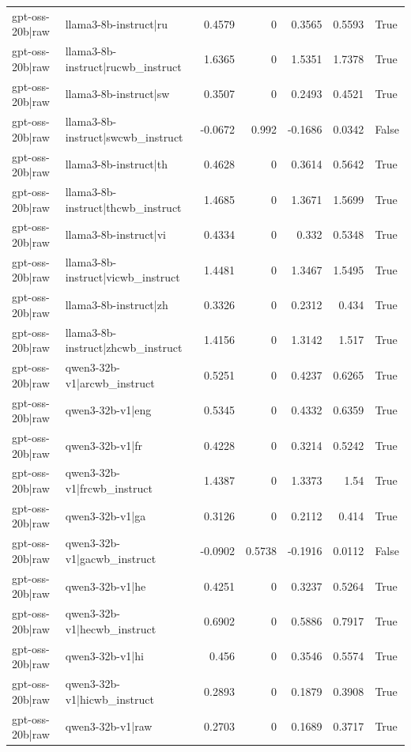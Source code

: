 \begin{table}
\begin{tabular}{l l r r r r l}
gpt-oss-20b|raw & llama3-8b-instruct|ru & 0.4579 & 0 & 0.3565 & 0.5593 & True \\
gpt-oss-20b|raw & llama3-8b-instruct|rucwb_instruct & 1.6365 & 0 & 1.5351 & 1.7378 & True \\
gpt-oss-20b|raw & llama3-8b-instruct|sw & 0.3507 & 0 & 0.2493 & 0.4521 & True \\
gpt-oss-20b|raw & llama3-8b-instruct|swcwb_instruct & -0.0672 & 0.992 & -0.1686 & 0.0342 & False \\
gpt-oss-20b|raw & llama3-8b-instruct|th & 0.4628 & 0 & 0.3614 & 0.5642 & True \\
gpt-oss-20b|raw & llama3-8b-instruct|thcwb_instruct & 1.4685 & 0 & 1.3671 & 1.5699 & True \\
gpt-oss-20b|raw & llama3-8b-instruct|vi & 0.4334 & 0 & 0.332 & 0.5348 & True \\
gpt-oss-20b|raw & llama3-8b-instruct|vicwb_instruct & 1.4481 & 0 & 1.3467 & 1.5495 & True \\
gpt-oss-20b|raw & llama3-8b-instruct|zh & 0.3326 & 0 & 0.2312 & 0.434 & True \\
gpt-oss-20b|raw & llama3-8b-instruct|zhcwb_instruct & 1.4156 & 0 & 1.3142 & 1.517 & True \\
gpt-oss-20b|raw & qwen3-32b-v1|arcwb_instruct & 0.5251 & 0 & 0.4237 & 0.6265 & True \\
gpt-oss-20b|raw & qwen3-32b-v1|eng & 0.5345 & 0 & 0.4332 & 0.6359 & True \\
gpt-oss-20b|raw & qwen3-32b-v1|fr & 0.4228 & 0 & 0.3214 & 0.5242 & True \\
gpt-oss-20b|raw & qwen3-32b-v1|frcwb_instruct & 1.4387 & 0 & 1.3373 & 1.54 & True \\
gpt-oss-20b|raw & qwen3-32b-v1|ga & 0.3126 & 0 & 0.2112 & 0.414 & True \\
gpt-oss-20b|raw & qwen3-32b-v1|gacwb_instruct & -0.0902 & 0.5738 & -0.1916 & 0.0112 & False \\
gpt-oss-20b|raw & qwen3-32b-v1|he & 0.4251 & 0 & 0.3237 & 0.5264 & True \\
gpt-oss-20b|raw & qwen3-32b-v1|hecwb_instruct & 0.6902 & 0 & 0.5886 & 0.7917 & True \\
gpt-oss-20b|raw & qwen3-32b-v1|hi & 0.456 & 0 & 0.3546 & 0.5574 & True \\
gpt-oss-20b|raw & qwen3-32b-v1|hicwb_instruct & 0.2893 & 0 & 0.1879 & 0.3908 & True \\
gpt-oss-20b|raw & qwen3-32b-v1|raw & 0.2703 & 0 & 0.1689 & 0.3717 & True \\

\end{tabular}
\end{table}
